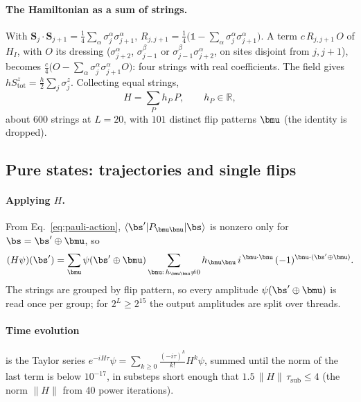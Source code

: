 \paragraph{The Hamiltonian as a sum of strings.} With $\mathbf S_j\cdot\mathbf S_{j+1} = \tfrac14\sum_\alpha\sigma^\alpha_j\sigma^\alpha_{j+1}$, $R_{j,j+1} = \tfrac14\big(\mathds 1 - \sum_{\alpha}\sigma^\alpha_j\sigma^\alpha_{j+1}\big)$. A term $c\,R_{j,j+1}\,O$ of $H_I$, with $O$ its dressing ($\sigma^\alpha_{j+2}$, $\sigma^\beta_{j-1}$ or $\sigma^\beta_{j-1}\sigma^\alpha_{j+2}$, on sites disjoint from $j, j+1$), becomes $\tfrac c4\big(O - \sum_\alpha\sigma^\alpha_j\sigma^\alpha_{j+1}O\big)$: four strings with real coefficients. The field gives $hS^z_{\mathrm{tot}} = \tfrac h2\sum_j\sigma^z_j$. Collecting equal strings,
\begin{equation}
H = \sum_{P} h_P\, P, \qquad h_P \in \mathbb R,
\end{equation}
about $600$ strings at $L = 20$, with $101$ distinct flip patterns $\bmu$ (the identity is dropped).

\subsection{Pure states: trajectories and single flips}

\paragraph{Applying $H$.} From Eq.~\eqref{eq:pauli-action}, $\langle\bs'\vert P_{\bmu\bnu}\vert\bs\rangle$ is nonzero only for $\bs = \bs'\oplus\bmu$, so
\begin{equation}
(H\psi)(\bs') = \sum_{\bmu}\psi(\bs'\oplus\bmu)\sum_{\bnu:\,h_{\bmu\bnu}\ne0} h_{\bmu\bnu}\, i^{\,\bmu\cdot\bnu}\,(-1)^{\bnu\cdot(\bs'\oplus\bmu)} .
\end{equation}
The strings are grouped by flip pattern, so every amplitude $\psi(\bs'\oplus\bmu)$ is read once per group; for $2^L \ge 2^{15}$ the output amplitudes are split over threads.

\paragraph{Time evolution} is the Taylor series $e^{-iH\tau}\psi = \sum_{k\ge0}\frac{(-i\tau)^k}{k!}H^k\psi$, summed until the norm of the last term is below $10^{-17}$, in substeps short enough that $1.5\,\lVert H\rVert\,\tau_{\mathrm{sub}} \le 4$ (the norm $\lVert H\rVert$ from 40 power iterations).

